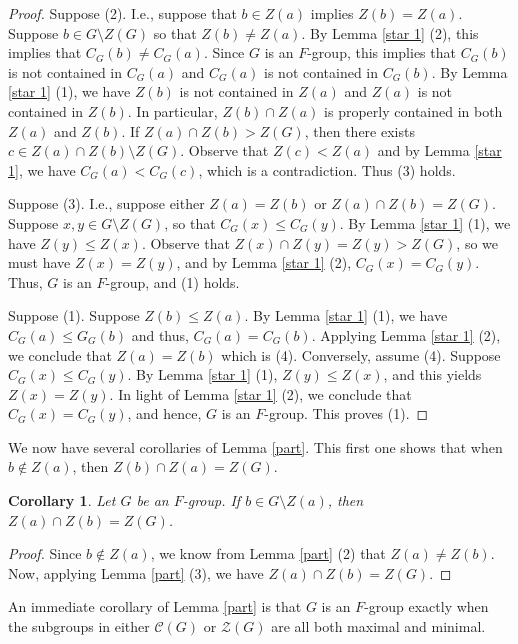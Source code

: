 \documentclass[12pt]{amsart}
\newtheorem{corollary}[theorem]{Corollary}
\begin{document}
{\begin{proof}
Suppose (2).  I.e., suppose that $b \in Z(a)$ implies $Z(b) = Z(a)$.  Suppose $b \in G \setminus Z(G)$ so that $Z(b) \ne Z(a)$.  By Lemma \ref{star 1} (2), this implies that $C_G (b) \ne C_G (a)$.  Since $G$ is an $F$-group, this implies that $C_G (b)$ is not contained in $C_G (a)$ and $C_G (a)$ is not contained in $C_G (b)$.  By Lemma \ref{star 1} (1), we have $Z(b)$ is not contained in $Z (a)$ and $Z(a)$ is not contained in $Z (b)$.  In particular, $Z(b) \cap Z(a)$ is properly contained in both $Z(a)$ and $Z (b)$.  If $Z(a) \cap Z(b) > Z(G)$, then there exists $c \in Z (a) \cap Z (b) \setminus Z (G)$.  Observe that $Z (c) < Z (a)$ and by Lemma \ref{star 1}, we have $C_G (a) < C_G (c)$, which is a contradiction.  Thus (3) holds.
	
Suppose (3).  I.e., suppose either $Z(a) = Z(b)$ or $Z(a) \cap Z (b) = Z (G)$.   Suppose  $x,y \in G \setminus Z(G)$, so that $C_G (x) \le C_G (y)$.  By Lemma \ref{star 1} (1), we have $Z (y) \le Z(x)$.  Observe that $Z(x) \cap Z(y) = Z(y) > Z(G)$, so we must have $Z(x) = Z(y)$, and by Lemma \ref{star 1}  (2), $C_G (x) = C_G (y)$.  Thus, $G$ is an $F$-group, and (1) holds. 
	
Suppose (1).  Suppose $Z(b) \le Z(a)$.  By Lemma \ref{star 1} (1), we have $C_G (a) \le G_G (b)$ and thus, $C_G (a) = C_G (b)$.  Applying Lemma \ref{star 1} (2), we conclude that $Z (a) = Z(b)$ which is (4).  Conversely, assume (4).  Suppose $C_G (x) \le C_G (y)$.  By Lemma \ref{star 1} (1), $Z(y) \le Z(x)$, and this yields $Z (x) = Z(y)$.  In light of Lemma \ref{star 1} (2), we conclude that $C_G (x) = C_G (y)$, and hence, $G$ is an $F$-group.  This proves (1).
\end{proof}

We now have several corollaries of Lemma \ref{part}.  This first one shows that when $b \not\in Z(a)$, then $Z(b) \cap Z(a) = Z(G)$.

\begin{corollary} \label{twob}
Let $G$ be an $F$-group.  If $b \in G \setminus Z(a)$, then $Z (a) \cap Z(b) = Z(G)$.
\end{corollary}

\begin{proof}
Since $b \not\in Z(a)$, we know from Lemma \ref{part} (2) that $Z (a) \ne Z(b)$.  Now, applying Lemma \ref{part} (3), we have $Z(a) \cap Z (b) = Z(G)$.
\end{proof}

An immediate corollary of Lemma \ref{part} is that $G$ is an $F$-group exactly when the subgroups in either $\mathcal{C} (G)$ or $\mathcal{Z} (G)$ are all both maximal and minimal.

}
\end{document}
